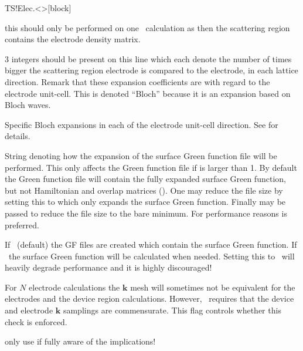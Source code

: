 \begin{fdfentry}{TS!Elec.<>}[block]
\begin{fdfoptions}
    \note this should only be performed on one \tsiesta\ calculation
    as then the scattering region  contains the
    electrode density matrix.

    \option[Bloch]%
    $3$ integers should be present on this line which each denote the
    number of times bigger the scattering region electrode is compared
    to the electrode, in each lattice direction. Remark that these
    expansion coefficients are with regard to the electrode unit-cell.
    This is denoted ``Bloch'' because it is an expansion based on
    Bloch waves.

    \option[Bloch-A/a1|B/a2|C/a3]%
    Specific Bloch expansions in each of the electrode unit-cell
    direction. See  for details.

    String denoting how the expansion of the surface Green function
    file will be performed. This only affects the Green function file
    if  is larger than 1. By default the Green function
    file will contain the fully expanded surface Green function, but
    not Hamiltonian and overlap matrices (). One may
    reduce the file size by setting this to  which only
    expands the surface Green function. Finally  may be
    passed to reduce the file size to the bare minimum.
    For performance reasons  is preferred. 

    If \fdftrue\ (default) the GF files are created which contain
    the surface Green function.
    If \fdffalse\ the surface Green function will be calculated when
    needed. 
    Setting this to \fdffalse\ will heavily degrade performance and
    it is highly discouraged!

    For $N$ electrode calculations the $\mathbf k$ mesh will sometimes
    not be equivalent for the electrodes and the device region
    calculations. However, \tsiesta\ requires that the device and
    electrode $\mathbf k$ samplings are commensurate. This flag
    controls whether this check is enforced.

    \note only use if fully aware of the implications!

  \end{fdfoptions}
  
\end{fdfentry}

